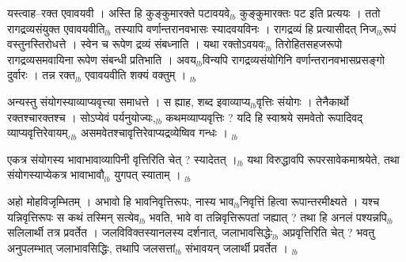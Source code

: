 \documentclass[article,12pt,a4paper]{memoir}%
\newcounter{parCount}
\begin{document}
	  \pstart \leavevmode%
	यस्त्वाह--रक्त एवावयवी । अस्ति हि कुङ्कुमारक्ते पटावयवे{\tiny $_{lb}$} कुङ्कुमारक्तः पट इति प्रत्ययः । ततो रागद्रव्यसंयुक्त एवावयवीति{\tiny $_{lb}$} तस्यापि वर्णान्तरानवभासः स्यादवयविनः । रागद्रव्यं हि प्रत्यासीदत् निज{\tiny $_{lb}$}रूपं वस्तुनस्तिरोधत्ते । स्वेन च रूपेण द्रव्यं संबध्नाति । यथा रक्तोऽवयवः{\tiny $_{lb}$} तिरोहितसहजरूपो रागद्रव्यसमवायिना रूपेण संबन्धी प्रतिभाति । अवय{\tiny $_{lb}$}विन्यपि रागद्रव्यसंयोगिनि वर्णान्तरानवभासप्रसङ्गो दुर्वारः । तन्न रक्त{\tiny $_{lb}$} एवावयवीति शक्यं वक्तुम् ।
	{}
	\pend%
      {\tiny $_{lb}$}

	  \pstart \leavevmode%
	अन्यस्तु संयोगस्याव्याप्यवृत्त्या समाधत्ते । स ह्याह, शब्द इवाव्याप्य{\tiny $_{lb}$}वृत्तिः संयोगः । तेनैकार्थो रक्तश्चारक्तश्च । सोऽप्येवं पर्यनुयोज्यः,{\tiny $_{lb}$} कथमव्याप्यवृत्तिः ? यदि हि स्वाश्रये समवेतो रूपादिवद् व्याप्यवृत्तिरेवायम्,{\tiny $_{lb}$} असमवेतश्चावृत्तिरेवाप्यद्रव्येष्विव गन्धः ।
	{}
	\pend%
      {\tiny $_{lb}$}

	  \pstart \leavevmode%
	एकत्र संयोगस्य भावाभावाव्यापिनी वृत्तिरिति चेत् ? स्यादेतत् ।{\tiny $_{lb}$} यथा विरुद्धावपि रूपरसावेकमाश्रयेते, तथा संयोगस्याप्येकत्र भावाभावौ{\tiny $_{lb}$} युगपत् स्याताम् ।
	{}
	\pend%
      {\tiny $_{lb}$}

	  \pstart \leavevmode%
	अहो मोहविजृम्भितम् । अभावो हि भावनिवृत्तिरूपः, नास्य भाव{\tiny $_{lb}$}निवृत्तिं हित्वा रूपान्तरमीक्ष्यते । यश्च यन्निवृत्तिरूपः स कथं तस्मिन् सत्येव{\tiny $_{lb}$} भवति, भावे वा तन्निवृत्तिरूपतां जह्यात् ? तथा हि अनलं पश्यन्नपि{\tiny $_{lb}$} सलिलार्थी तत्र प्रवर्तेत । जलविविक्तस्यानलस्य दर्शनात्, जलाभावसिद्धेः{\tiny $_{lb}$} \leavevmode{} अप्रवृत्तिरिति चेत् ? भवतु अनुपलम्भात् जलाभावसिद्धिः, तथापि जलसत्तां{\tiny $_{lb}$} संभावयन् जलार्थी प्रवर्तेत ।
	{}
	\pend%
      {\tiny $_{lb}$}
\end{document}
